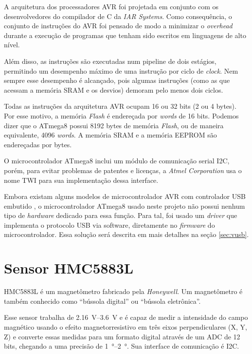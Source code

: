 \documentclass[brazil,pagestart=firstchapter]{abnt}
\begin{document}
A arquitetura dos processadores AVR foi projetada em conjunto com os
desenvolvedores do compilador de C da \textit{IAR Systems}. Como
consequência, o conjunto de instruções do AVR foi pensado de modo a
minimizar o \textit{overhead} durante a execução de programas que tenham
sido escritos em linguagens de alto nível. \cite{avr_iar_design}

Além disso, as instruções são executadas num pipeline de dois estágios,
permitindo um desempenho máximo de uma instrução por ciclo de
\textit{clock}. \cite[p.~9]{ATmega8} Nem sempre esse desempenho é
alcançado, pois algumas instruções (como as que acessam a memória \ac{SRAM}
e os desvios) demoram pelo menos dois ciclos. \cite[p.~282]{ATmega8}

Todas as instruções da arquitetura AVR ocupam 16 ou 32 bits (2 ou 4 bytes).
Por esse motivo, a memória \textit{Flash} é endereçada por \textit{words} de
16 bits. Podemos dizer que o ATmega8 possui \num{8192} bytes de memória
\textit{Flash}, ou de maneira equivalente, \num{4096} \textit{words}.
\cite[p.~17]{ATmega8} A memória \ac{SRAM} e a memória \ac{EEPROM} são
endereçadas por bytes. \cite[p.~18-19]{ATmega8}

O microcontrolador ATmega8 inclui um módulo de comunicação serial \ac{I2C},
porém, para evitar problemas de patentes e licenças, a \textit{Atmel
Corporation} usa o nome \ac{TWI} para sua implementação dessa interface.
\cite{avrlibctwi}

Embora existam alguns modelos de microcontrolador AVR com controlador
\ac{USB} embutido \cite{atmel_avr_product_list}, o microcontrolador ATmega8
usado neste projeto não possui nenhum tipo de \textit{hardware} dedicado
para essa função. Para tal, foi usado um \textit{driver} que implementa o
protocolo \ac{USB} via software, diretamente no \textit{firmware} do
microcontrolador. Essa solução será descrita em mais detalhes na seção
\ref{sec:vusb}.


\section{Sensor HMC5883L}
\label{sec:sensor}

HMC5883L é um magnetômetro fabricado pela \textit{Honeywell}. Um
magnetômetro é também conhecido como ``bússola digital'' ou ``bússola
eletrônica''.

Esse sensor trabalha de \SIrange{2.16}{3.6}{\volt} e é capaz de medir a
intensidade do campo magnético usando o efeito magnetorresistivo em três
eixos perpendiculares (X, Y, Z) e converte essas medidas para um formato
digital através de um \ac{ADC} de 12 bits, chegando a uma precisão de
\SIrange{1}{2}{\degree}. Sua interface de comunicação é \ac{I2C}.
\cite{HMC5883L}
\end{document}
